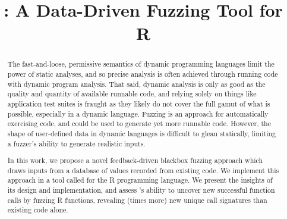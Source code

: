 \documentclass[sigplan,anonymous,review]{acmart}
\begin{document}
\title{\tool: A Data-Driven Fuzzing Tool for R}

\begin{abstract}

The fast-and-loose, permissive semantics of dynamic programming languages limit the power of static analyses, and so precise analysis is often achieved through running code with dynamic program analysis. 
That said, dynamic analysis is only as good as the quality and quantity of available runnable code, and relying solely on things like application test suites is fraught as they likely do not cover the full gamut of what is possible, especially in a dynamic language.
Fuzzing is an approach for automatically exercising code, and could be used to generate yet more runnable code.
However, the shape of user-defined data in dynamic languages is difficult to glean statically, limiting a fuzzer's ability to generate realistic inputs.

In this work, we propose a novel feedback-driven blackbox fuzzing approach which draws inputs from a database of values recorded from existing code.
We implement this approach in a tool called \tool for the R programming language.
We present the insights of its design and implementation, and assess \tool's ability to uncover new successful function calls by fuzzing \UFNumFunctions R functions, revealing \UFSignatrSignatures (\UFSignatrBaselineSignaturesRatio times more) new unique call signatures than existing code alone.


%
%




\end{abstract}
\end{document}
